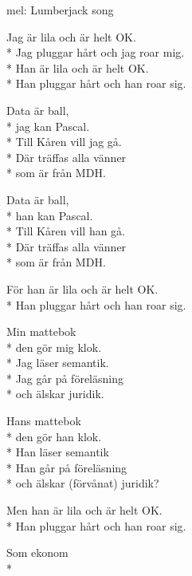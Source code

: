 \begin{SongText}
    \begin{SongInfo}
        mel: Lumberjack song
    \end{SongInfo}
\begin{Verse}
Jag är lila och är helt OK.\\*%
Jag pluggar hårt och jag roar mig.\\*%
Han är lila och är helt OK.\\*%
Han pluggar hårt och han roar sig.
\end{Verse}
\begin{Verse}
Data är ball,\\*%
jag kan Pascal.\\*%
Till Kåren vill jag gå.\\*%
Där träffas alla vänner\\*%
som är från MDH.
\end{Verse}
\begin{Verse}
Data är ball,\\*%
han kan Pascal.\\*%
Till Kåren vill han gå.\\*%
Där träffas alla vänner\\*%
som är från MDH.
\end{Verse}
\begin{Verse}
För han är lila och är helt OK.\\*%
Han pluggar hårt och han roar sig.
\end{Verse}
\begin{Verse}
Min mattebok\\*%
den gör mig klok.\\*%
Jag läser semantik.\\*%
Jag går på föreläsning\\*%
och älskar juridik.
\end{Verse}
\begin{Verse}
Hans mattebok\\*%
den gör han klok.\\*%
Han läser semantik\\*%
Han går på föreläsning\\*%
och älskar (förvånat) juridik?
\end{Verse}
\begin{Verse}
Men han är lila och är helt OK.\\*%
Han pluggar hårt och han roar sig.
\end{Verse}
\begin{Verse}
Som ekonom\\*%

\end{Verse}
\end{SongText}
